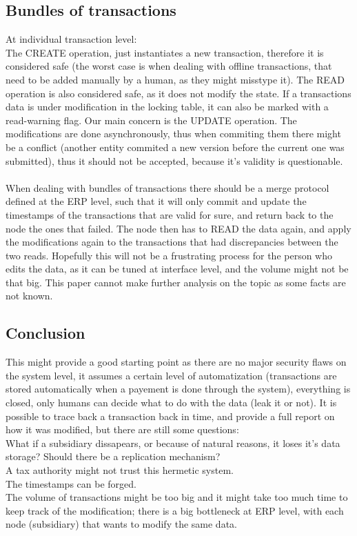 \subsection{Bundles of transactions}
At individual transaction level:\\
The CREATE operation, just instantiates a new transaction, therefore it is considered safe (the worst case is when dealing with offline transactions, that need to be added manually by a human, as they might misstype it). The READ operation is also considered safe, as it does not modify the state. If a transactions data is under modification in the locking table, it can also be marked with a read-warning flag. Our main concern is the UPDATE operation. The modifications are done asynchronously, thus when commiting them there might be a conflict (another entity commited a new version before the current one was submitted), thus it should not be accepted, because it's validity is questionable.\\
\\
When dealing with bundles of transactions there should be a merge protocol defined at the ERP level, such that it will only commit and update the timestamps of the transactions that are valid for sure, and return back to the node the ones that failed. The node then has to READ the data again, and apply the modifications again to the transactions that had discrepancies between the two reads. Hopefully this will not be a frustrating process for the person who edits the data, as it can be tuned at interface level, and the volume might not be that big. This paper cannot make further analysis on the topic as some facts are not known.\\
\subsection{Conclusion}
This might provide a good starting point as there are no major security flaws on the system level, it assumes a certain level of automatization (transactions are stored automatically when a payement is done through the system), everything is closed, only humans can decide what to do with the data (leak it or not). It is possible to trace back a transaction back in time, and provide a full report on how it was modified, but there are still some questions:\\
What if a subsidiary dissapears, or because of natural reasons, it loses it's data storage? Should there be a replication mechanism?\\
A tax authority might not trust this hermetic system.\\
The timestamps can be forged.\\
The volume of transactions might be too big and it might take too much time to keep track of the modification; there is a big bottleneck at ERP level, with each node (subsidiary) that wants to modify the same data.\\